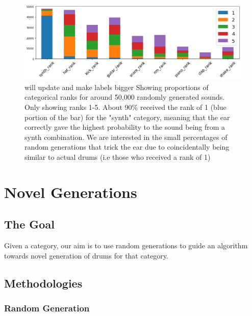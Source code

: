 \documentclass{nime-alternate} %
\begin{document}
\begin{figure}[h!]
\centering
\includegraphics[width=1\linewidth]{images/random_ranks.png}
\caption{\colorbox{green!=40}{will update and make labels bigger} Showing proportions of categorical ranks for around 50,000 randomly generated sounds. Only showing ranks 1-5. About 90\% received the rank of 1 (blue portion of the bar) for the "synth" category, meaning that the ear correctly gave the highest probability to the sound being from a synth combination. We are interested in the small percentages of random generations that trick the ear due to coincidentally being similar to actual drums (i.e those who received a rank of 1) }


\label{fig:rank portions}
\end{figure}
\section{Novel Generations}
\label{gens}
\subsection{The Goal}
 Given a category, our aim is to use random generations to guide an algorithm towards novel generation of drums for that category.

\subsection{Methodologies}
\subsubsection{Random Generation}
\end{document}
